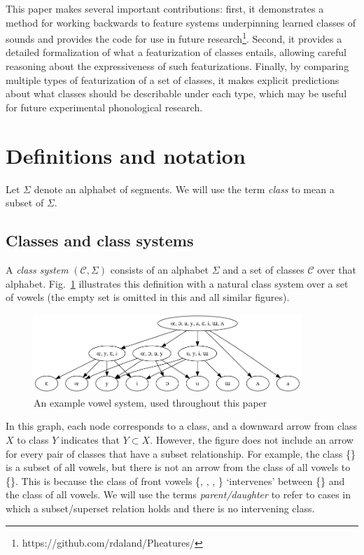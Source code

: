 \documentclass[11pt, oneside]{article}   	%
\begin{document}
This paper makes several important contributions: first, it demonstrates a method for working backwards to feature systems underpinning learned classes of sounds and provides the code for use in future research\footnote{https://github.com/rdaland/Pheatures/}. Second, it provides a detailed formalization of what a featurization of classes entails, allowing careful reasoning about the expressiveness of such featurizations. Finally, by comparing multiple types of featurization of a set of classes, it makes explicit predictions about what classes should be describable under each type, which may be useful for future experimental phonological research.

\section{Definitions and notation}

Let $\Sigma$ denote an alphabet of segments. We will use the term \textit{class} to mean a subset of $\Sigma$.

\subsection{Classes and class systems}

A \textit{class system} $(\mathcal C, \Sigma)$ consists of an alphabet $\Sigma$ and a set of classes $\mathcal C$ over that alphabet. Fig.~\ref{fig:lattice} illustrates this definition with a natural class system over a set of vowels  (the empty set is omitted in this and all similar figures).

\begin{figure}[h]
\includegraphics[width=0.9\textwidth]{vowelHarmony_unicode.png}
\caption{An example vowel system, used throughout this paper}
\label{fig:lattice}
\end{figure}

In this graph, each node corresponds to a class, and a downward arrow from class $X$ to class $Y$ indicates that $Y \subset X$. However, the figure does not include an arrow for every pair of classes that have a subset relationship. For example, the class \{\} is a subset of all vowels, but there is not an arrow from the class of all vowels to \{\}. This is because the class of front vowels \{\textipa{\oe}, , , \} `intervenes' between \{\} and the class of all vowels. We will use the terms \textit{parent/daughter} to refer to cases in which a subset/superset relation holds and there is no intervening class.
\end{document}
